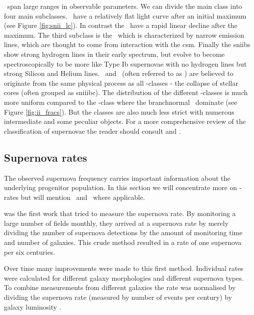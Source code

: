 \sneii\ span large ranges in observable parameters. We can divide the main class into four main subclasses. \sneiip\ have a relatively flat light curve after an initial maximum (see Figure \ref{fig:snii_lc}). In contrast the \sneiil\ have a rapid linear decline after the maximum. The third subclass is the \sniin\ which is characterized by narrow emission lines, which are thought to come from interaction with the \gls{csm}. Finally the \glspl{sniib} show strong hydrogen lines in their early spectrum, but evolve to become spectroscopically to be more like Type Ib supernovae with no hydrogen lines but strong Silicon and Helium lines. \sneib\ and \sneic\ (often referred to as \sneibc) are believed to originate from the same physical process as all \snii-classes - the collapse of stellar cores (often grouped as \gls{sniiibc}). The distribution of the different \snii-classes is much more uniform compared to the \snia-class where the \gls{branchnormal} \sneia\ dominate (see Figure \ref{fig:ii_fracs}). But the classes are also much less strict with numerous intermediate and some peculiar objects. For a more comprehensive review of the classification of supernovae the reader should consult \citet{2003LNP...598...21T} and \citet{2007AIPC..937..187T}.

\subsection{Supernova rates}
\label{sec:sn_rates}
The observed supernova frequency carries important information about the underlying progenitor population. In this section we will concentrate more on \sneia-rates but will mention \sneii\ and \sneibc\ where applicable.

\citet{1938ApJ....88..529Z} was the first work that tried to measure the supernova rate. By monitoring a large number of fields monthly, they arrived at a supernova rate by merely dividing the number of supernova detections by the amount of monitoring time and number of galaxies. This crude method resulted in a rate of one supernova per six centuries. 

Over time many improvements were made to this first method. Individual rates were calculated for different galaxy morphologies and different supernova types. To combine measurements from different galaxies the rate was normalised by dividing the supernova rate (measured by number of events per century) by galaxy luminosity \citep[e.g.][]{1991ARA&A..29..363V,1994ApJS...92..487T}. 

